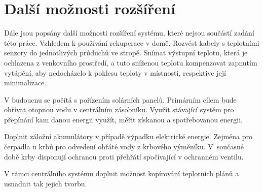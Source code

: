 \chapter{Další možnosti rozšíření}
Dále jsou popsány další možnosti rozšíření systému, které nejsou součástí zadání této práce. Vzhledem k používání rekuperace v domě. Rozvést kabely s teplotními senzory do jednotlivých průduchů ve stropě. Snímat výstupní teplotu, která je ochlazena z venkovního prostředí, a tuto sníženou teplotu kompenzovat zapnutím vytápění, aby nedocházelo k poklesu teploty v místnosti, respektive její minimalizace.

V budoucnu se počítá s pořízením solárních panelů. Primárním cílem bude ohřívat otopnou vodu v centrálním zásobníku. Využít stávající systém pro přepínání kam danou energii využít, měřit získanou a spotřebovanou energii.

Doplnit záložní akumulátory v případě výpadku elektrické energie. Zejména pro čerpadla u krbů pro odvedení ohřáté vody z krbového výměníku. V~současné době krby disponují ochranou proti přehřátí spočívající v ochranném ventilu.

V rámci centrálního systému doplnit možnost kopírování teplotních plánů a usnadnit tak jejich tvorbu. 